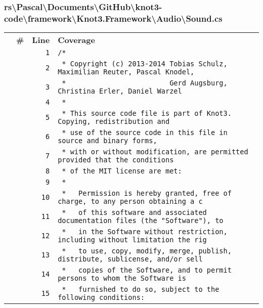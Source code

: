\documentclass[a4paper,10pt]{article}
\begin{document}
\subsubsection{rs\textbackslash Pascal\textbackslash Documents\textbackslash GitHub\textbackslash knot3-code\textbackslash framework\textbackslash Knot3.Framework\textbackslash Audio\textbackslash Sound.cs}
\begin{longtable}[l]{lrrl}
\textbf{} & \textbf{\#} & \textbf{Line} & \textbf{Coverage}\\
\cellcolor{gray} &  & \verb~1~ & \verb~/*~\\
\cellcolor{gray} &  & \verb~2~ & \verb~ * Copyright (c) 2013-2014 Tobias Schulz, Maximilian Reuter, Pascal Knodel,~\\
\cellcolor{gray} &  & \verb~3~ & \verb~ *                         Gerd Augsburg, Christina Erler, Daniel Warzel~\\
\cellcolor{gray} &  & \verb~4~ & \verb~ *~\\
\cellcolor{gray} &  & \verb~5~ & \verb~ * This source code file is part of Knot3. Copying, redistribution and~\\
\cellcolor{gray} &  & \verb~6~ & \verb~ * use of the source code in this file in source and binary forms,~\\
\cellcolor{gray} &  & \verb~7~ & \verb~ * with or without modification, are permitted provided that the conditions~\\
\cellcolor{gray} &  & \verb~8~ & \verb~ * of the MIT license are met:~\\
\cellcolor{gray} &  & \verb~9~ & \verb~ *~\\
\cellcolor{gray} &  & \verb~10~ & \verb~ *   Permission is hereby granted, free of charge, to any person obtaining a c~\\
\cellcolor{gray} &  & \verb~11~ & \verb~ *   of this software and associated documentation files (the "Software"), to ~\\
\cellcolor{gray} &  & \verb~12~ & \verb~ *   in the Software without restriction, including without limitation the rig~\\
\cellcolor{gray} &  & \verb~13~ & \verb~ *   to use, copy, modify, merge, publish, distribute, sublicense, and/or sell~\\
\cellcolor{gray} &  & \verb~14~ & \verb~ *   copies of the Software, and to permit persons to whom the Software is~\\
\cellcolor{gray} &  & \verb~15~ & \verb~ *   furnished to do so, subject to the following conditions:~\\

\end{longtable}
\end{document}
